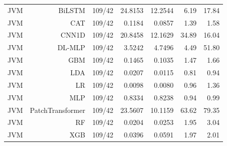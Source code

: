 \begin{table}[htbp]
\begin{tabular}{lrrrrrr}
JVM & BiLSTM & 109/42 & 24.8153 & 12.2544 & 6.19 & 17.84 \\
JVM & CAT & 109/42 & 0.1184 & 0.0857 & 1.39 & 1.58 \\
JVM & CNN1D & 109/42 & 20.8458 & 12.1629 & 34.89 & 16.04 \\
JVM & DL-MLP & 109/42 & 3.5242 & 4.7496 & 4.49 & 51.80 \\
JVM & GBM & 109/42 & 0.1465 & 0.1035 & 1.47 & 1.66 \\
JVM & LDA & 109/42 & 0.0207 & 0.0115 & 0.81 & 0.94 \\
JVM & LR & 109/42 & 0.0098 & 0.0080 & 0.96 & 1.36 \\
JVM & MLP & 109/42 & 0.8334 & 0.8238 & 0.94 & 0.99 \\
JVM & PatchTransformer & 109/42 & 23.5607 & 10.1159 & 63.62 & 79.35 \\
JVM & RF & 109/42 & 0.0204 & 0.0253 & 1.95 & 3.04 \\
JVM & XGB & 109/42 & 0.0396 & 0.0591 & 1.97 & 2.01 \\
\hline
\end{tabular}
\end{table}
